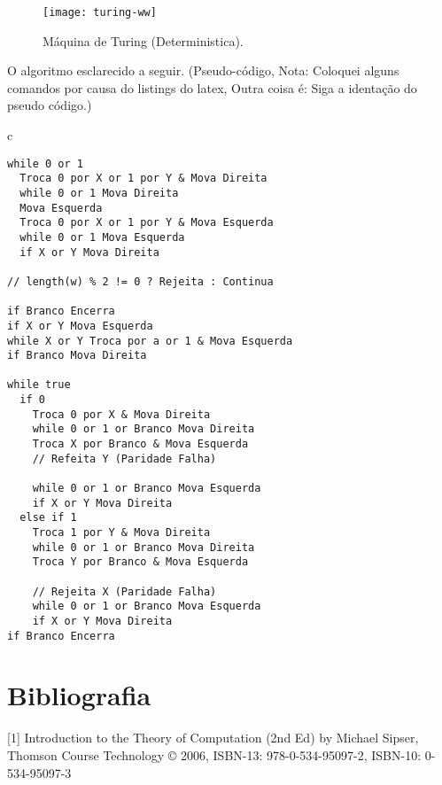\documentclass[12pt, a4paper]{article}
\begin{document}
\begin{figure}[ht]
\centering
\texttt{[image: turing-ww]}
\caption{Máquina de Turing (Deterministica).}
\end{figure}


\qquad O algoritmo esclarecido a seguir. (Pseudo-código, Nota: Coloquei alguns comandos por causa do listings do latex, Outra coisa é: Siga a identação do pseudo código.)

\begin{center}
\begin{tabular}{c}
\begin{lstlisting}
while 0 or 1
  Troca 0 por X or 1 por Y & Mova Direita
  while 0 or 1 Mova Direita
  Mova Esquerda
  Troca 0 por X or 1 por Y & Mova Esquerda
  while 0 or 1 Mova Esquerda
  if X or Y Mova Direita

// length(w) % 2 != 0 ? Rejeita : Continua

if Branco Encerra
if X or Y Mova Esquerda
while X or Y Troca por a or 1 & Mova Esquerda
if Branco Mova Direita

while true
  if 0
    Troca 0 por X & Mova Direita
    while 0 or 1 or Branco Mova Direita
    Troca X por Branco & Mova Esquerda
    // Refeita Y (Paridade Falha)

    while 0 or 1 or Branco Mova Esquerda
    if X or Y Mova Direita
  else if 1
    Troca 1 por Y & Mova Direita
    while 0 or 1 or Branco Mova Direita
    Troca Y por Branco & Mova Esquerda
    
    // Rejeita X (Paridade Falha)
    while 0 or 1 or Branco Mova Esquerda
    if X or Y Mova Direita
if Branco Encerra
\end{lstlisting}
\end{tabular}
\end{center}


\pagebreak
\section{Bibliografia}

[1] Introduction to the Theory of Computation (2nd Ed) by Michael Sipser, Thomson Course Technology © 2006, ISBN-13: 978-0-534-95097-2, ISBN-10: 0-534-95097-3
\end{document}
